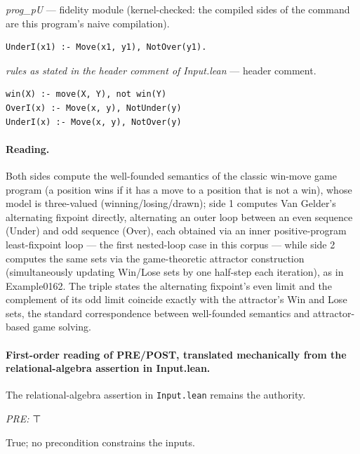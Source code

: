 \documentclass[10pt]{article}
\begin{document}
{\raggedright\textit{prog\_pU} --- fidelity module (kernel-checked: the compiled sides of the command are this program's naive compilation).\par}

\begin{Verbatim}[fontsize=\scriptsize,breaklines=true,breakanywhere=true,frame=single,framesep=1.5mm]
UnderI(x1) :- Move(x1, y1), NotOver(y1).
\end{Verbatim}

{\raggedright\textit{rules as stated in the header comment of Input.lean} --- header comment.\par}

\begin{Verbatim}[fontsize=\scriptsize,breaklines=true,breakanywhere=true,frame=single,framesep=1.5mm]
win(X) :- move(X, Y), not win(Y)
OverI(x) :- Move(x, y), NotUnder(y)
UnderI(x) :- Move(x, y), NotOver(y)
\end{Verbatim}

\paragraph{Reading.} Both sides compute the well-founded semantics of the classic win-move game program (a position wins if it has a move to a position that is not a win), whose model is three-valued (winning/losing/drawn); side 1 computes Van Gelder's alternating fixpoint directly, alternating an outer loop between an even sequence (Under) and odd sequence (Over), each obtained via an inner positive-program least-fixpoint loop --- the first nested-loop case in this corpus --- while side 2 computes the same sets via the game-theoretic attractor construction (simultaneously updating Win/Lose sets by one half-step each iteration), as in Example0162. The triple states the alternating fixpoint's even limit and the complement of its odd limit coincide exactly with the attractor's Win and Lose sets, the standard correspondence between well-founded semantics and attractor-based game solving.

\paragraph{First-order reading of PRE/POST, translated mechanically from the relational-algebra assertion in Input.lean.} The relational-algebra assertion in \texttt{Input.lean} remains the authority.

\textit{PRE:} ⊤\par True; no precondition constrains the inputs.
\end{document}
